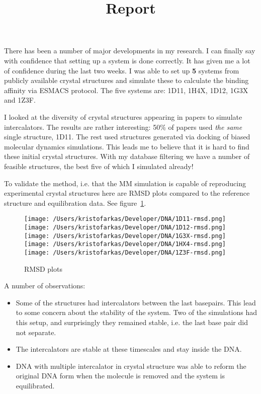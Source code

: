 \documentclass{article}
\title{Report}
\author{}
\begin{document}
  
\maketitle
  
There has been a number of major developments in my research. I can finally say with confidence that setting up a system is done correctly. It has given me a lot of confidence during the last two weeks. I was able to set up \textbf{5} systems from publicly available crystal structures and simulate these to calculate the binding affinity via ESMACS protocol. The five systems are: 1D11, 1H4X, 1D12, 1G3X and 1Z3F. 

I looked at the diversity of crystal structures appearing in papers to simulate intercalators. The results are rather interesting: 50\% of papers used \emph{the same} single structure, 1D11. The rest used structures generated via docking of biased molecular dynamics simulations. This leads me to believe that it is hard to find these initial crystal structures. With my database filtering we have a number of feasible structures, the best five of which I simulated already!

To validate the method, i.e. that the MM simulation is capable of reproducing experimental crystal structures here are RMSD plots compared to the reference structure and equilibration data. See figure~\ref{fig:rmsd}. 

\begin{figure}
  \texttt{[image: /Users/kristofarkas/Developer/DNA/1D11-rmsd.png]}%
  \texttt{[image: /Users/kristofarkas/Developer/DNA/1D12-rmsd.png]}
  \texttt{[image: /Users/kristofarkas/Developer/DNA/1G3X-rmsd.png]}%
  \texttt{[image: /Users/kristofarkas/Developer/DNA/1HX4-rmsd.png]}
  \texttt{[image: /Users/kristofarkas/Developer/DNA/1Z3F-rmsd.png]}
  \caption{RMSD plots}
  \label{fig:rmsd}
\end{figure}

A number of observations:

\begin{itemize}
  \item Some of the structures had intercalators between the last basepairs. This lead to some concern about the stability of the system. Two of the simulations had this setup, and surprisingly they remained stable, i.e. the last base pair did not separate.
  \item The intercalators are stable at these timescales and stay inside the DNA. 
  \item DNA with multiple intercalator in crystal structure was able to reform the original DNA form when the molecule is removed and the system is equilibrated. 

\end{itemize}
  
\end{document}

